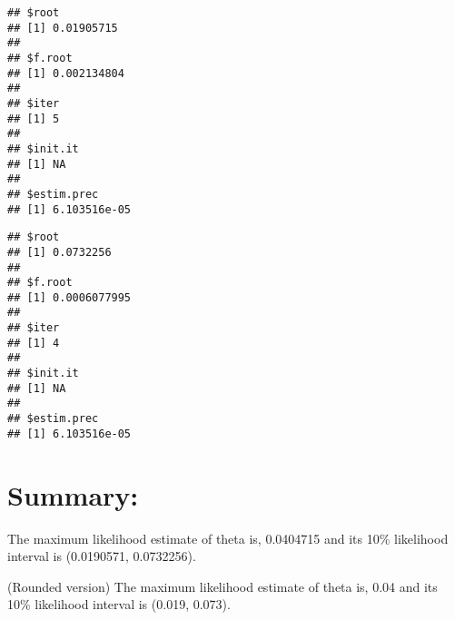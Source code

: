\documentclass[
]{article}
\newenvironment{Shaded}{\begin{snugshade}}{\end{snugshade}}
\newcommand{\CommentTok}[1]{\textcolor[rgb]{0.56,0.35,0.01}{\textit{#1}}}
\newcommand{\DecValTok}[1]{\textcolor[rgb]{0.00,0.00,0.81}{#1}}
\newcommand{\FunctionTok}[1]{\textcolor[rgb]{0.13,0.29,0.53}{\textbf{#1}}}
\newcommand{\NormalTok}[1]{#1}
\newcommand{\OtherTok}[1]{\textcolor[rgb]{0.56,0.35,0.01}{#1}}
\newcommand{\SpecialCharTok}[1]{\textcolor[rgb]{0.81,0.36,0.00}{\textbf{#1}}}
\begin{document}
\begin{Shaded}
\end{Shaded}

\begin{verbatim}
## $root
## [1] 0.01905715
## 
## $f.root
## [1] 0.002134804
## 
## $iter
## [1] 5
## 
## $init.it
## [1] NA
## 
## $estim.prec
## [1] 6.103516e-05
\end{verbatim}

\begin{Shaded}
\end{Shaded}

\begin{verbatim}
## $root
## [1] 0.0732256
## 
## $f.root
## [1] 0.0006077995
## 
## $iter
## [1] 4
## 
## $init.it
## [1] NA
## 
## $estim.prec
## [1] 6.103516e-05
\end{verbatim}

\hypertarget{summary}{%
\section{Summary:}\label{summary}}

The maximum likelihood estimate of theta is, 0.0404715 and its 10\%
likelihood interval is (0.0190571, 0.0732256).

(Rounded version) The maximum likelihood estimate of theta is, 0.04 and
its 10\% likelihood interval is (0.019, 0.073).
\end{document}
